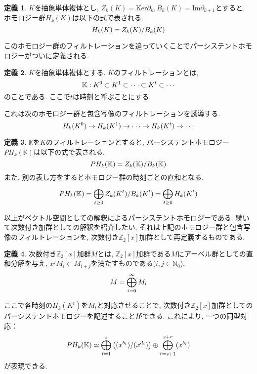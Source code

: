 \documentclass[a4paper]{jsarticle}
\theoremstyle{definition}
\newtheorem{dfn}{定義}[section]
\newcommand{\Ker}{{\mathrm{Ker}}}
\newcommand{\Image}{{\mathrm{Im}}}
\begin{document}
\begin{dfn}
    $K$を抽象単体複体とし, $Z_k(K)=\Ker \partial_k, B_k(K)=\Image \partial_{k+1}$とすると, ホモロジー群$H_k(K)$は以下の式で表される.
    \begin{equation}
        H_k(K)=Z_k(K)/B_k(K)\notag
    \end{equation}
\end{dfn}
このホモロジー群のフィルトレーションを追っていくことでパーシステントホモロジーがついに定義される. 
\begin{dfn}
    $K$を抽象単体複体とする. $K$のフィルトレーションとは, 
    \begin{equation}
        \mathbb{K}: K^0\subset K^1\subset \cdot\cdot\cdot\subset K^t\subset \cdot\cdot\cdot \notag
    \end{equation}
    のことである. ここで$t$は時刻と呼ぶことにする.
\end{dfn}
これは次のホモロジー群と包含写像のフィルトレーションを誘導する.
\begin{equation}
     H_k(K^0)\rightarrow H_k(K^1)\rightarrow \cdot\cdot\cdot\rightarrow H_k(K^t)\rightarrow \cdot\cdot\cdot\notag
    \end{equation}
\begin{dfn}
    $\mathbb{K}$を$K$のフィルトレーションとすると, パーシステントホモロジー$PH_k(\mathbb{K})$は以下の式で表される.
    \begin{equation}
        PH_k(\mathbb{K})=Z_k(\mathbb{K})/B_k(\mathbb{K})\notag
    \end{equation}
    また, 別の表し方をするとホモロジー群の時刻ごとの直和となる.
    \begin{equation}
        PH_k(\mathbb{K})=\bigoplus_{t\geq 0}^{} Z_k(K^t)/B_k(K^t)=\bigoplus_{t\geq 0}^{}H_k(K^t)\\ \notag
    \end{equation}
\end{dfn}
以上がベクトル空間としての解釈によるパーシステントホモロジーである. 続いて次数付き加群としての解釈を紹介したい. それは上記のホモロジー群と包含写像のフィルトレーションを, 次数付き$\mathbb{Z}_2[x]$加群として再定義するものである. 

\begin{dfn}
    次数付き$\mathbb{Z}_2[x]$加群$M$とは, $\mathbb{Z}_2[x]$加群である$M$にアーベル群としての直和分解を与え, $x^jM_i\subset M_{i+j}$を満たすものである($i,j\in\mathbb{N}_0$).
    \begin{equation}
        M=\bigoplus_{i=0}^{\infty} M_i\notag
    \end{equation}
\end{dfn}
ここで各時刻の$H_k(K^t)$を$M_t$と対応させることで, 次数付き$\mathbb{Z}_2[x]$加群としてのパーシステントホモロジーを記述することができる. これにより, 一つの同型対応：
\begin{equation}
    PH_k(\mathbb{K})\simeq \bigoplus_{t=1}^{s} \left( (x^{b_i})/(x^{d_i}) \right) \oplus \bigoplus_{t=s+1}^{s+r}(x^{b_i})\\ \notag
\end{equation}
が表現できる. 
\end{document}
